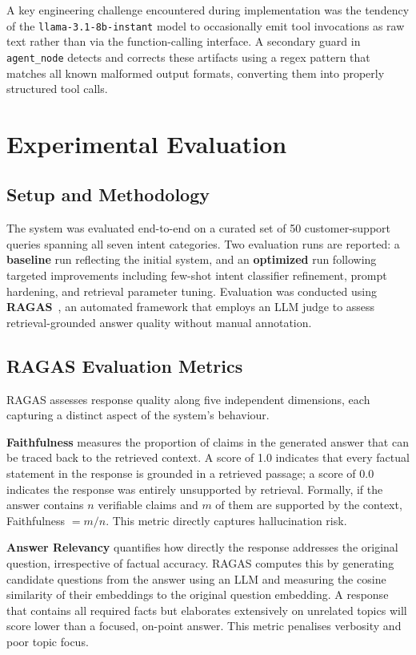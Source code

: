 \documentclass[conference]{IEEEtran}
\begin{document}
A key engineering challenge encountered during implementation was the tendency of
the \texttt{llama-3.1-8b-instant} model to occasionally emit tool invocations as
raw text rather than via the function-calling interface. A secondary guard in
\texttt{agent\_node} detects and corrects these artifacts using a regex pattern
that matches all known malformed output formats, converting them into properly
structured tool calls.

\section{Experimental Evaluation}

\subsection{Setup and Methodology}
The system was evaluated end-to-end on a curated set of 50 customer-support queries
spanning all seven intent categories. Two evaluation runs are reported: a
\textbf{baseline} run reflecting the initial system, and an \textbf{optimized} run
following targeted improvements including few-shot intent classifier refinement,
prompt hardening, and retrieval parameter tuning. Evaluation was conducted using
\textbf{RAGAS}~\cite{b18}, an automated framework that employs an LLM judge to
assess retrieval-grounded answer quality without manual annotation.

\subsection{RAGAS Evaluation Metrics}
RAGAS assesses response quality along five independent dimensions, each capturing
a distinct aspect of the system's behaviour.

\textbf{Faithfulness} measures the proportion of claims in the generated answer
that can be traced back to the retrieved context. A score of 1.0 indicates that
every factual statement in the response is grounded in a retrieved passage; a score
of 0.0 indicates the response was entirely unsupported by retrieval. Formally, if
the answer contains $n$ verifiable claims and $m$ of them are supported by the
context, Faithfulness $= m/n$. This metric directly captures hallucination risk.

\textbf{Answer Relevancy} quantifies how directly the response addresses the
original question, irrespective of factual accuracy. RAGAS computes this by
generating candidate questions from the answer using an LLM and measuring the
cosine similarity of their embeddings to the original question embedding. A response
that contains all required facts but elaborates extensively on unrelated topics will
score lower than a focused, on-point answer. This metric penalises verbosity and
poor topic focus.
\end{document}
